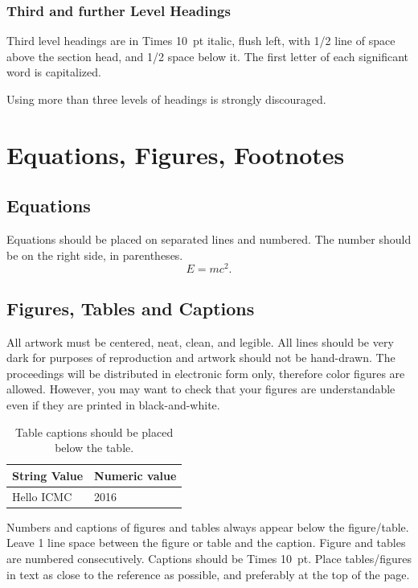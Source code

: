 \documentclass{article}
\begin{document}
\subsubsection{Third and further Level Headings}
Third level headings are in Times 10~pt italic, flush left, with 1/2 line of space above the section head, and 1/2 space below it. The first letter of each significant word is capitalized.

Using more than three levels of headings is strongly discouraged.

\pagebreak

\section{Equations, Figures, Footnotes}

\subsection{Equations}
Equations should be placed on separated lines and numbered.
The number should be on the right side, in parentheses.
\begin{equation}
E=mc^{2}.
\label{eq:Emc2}
\end{equation}

\subsection{Figures, Tables and Captions}
All artwork must be centered, neat, clean, and legible. All lines should be very dark for purposes of reproduction and artwork should not be hand-drawn. The proceedings will be distributed in electronic form only, therefore color figures are allowed. However, you may want to check that your figures are understandable even if they are printed in black-and-white.
\begin{table}[h]
 \begin{center}
 \begin{tabular}{|l|l|}
  \hline
  String Value & Numeric value \\
  \hline
  Hello ICMC & 2016 \\
  \hline
 \end{tabular}
\end{center}
 \caption{Table captions should be placed below the table.}
 \label{tab:example}
\end{table}

Numbers and captions of figures and tables always appear below the figure/table. Leave 1 line space between the figure or table and the caption. Figure and tables are numbered consecutively. Captions should be Times 10~pt. Place tables/figures in text as close to the reference as possible, and preferably at the top of the page.
\end{document}
